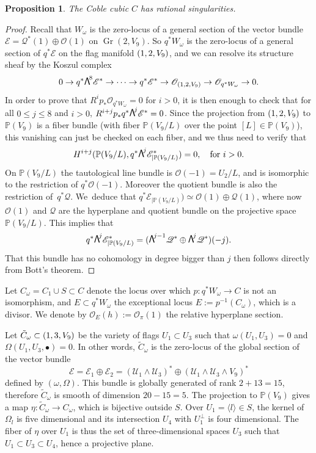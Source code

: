 \documentclass[JEP,XML,SOM,Unicode,NoEqCountersInSection]{cedram}
\newcommand{\NoChangel}[1]{%
\expandafter\let\csname old\string#1\endcsname=#1
\let#1=\relax
\newcommand{#1}{\mathcode`l="716C\csname old\string#1\endcsname\mathcode`l="7160 }%
}
\newcommand{\sbullet}{{\scriptstyle\bullet}}
\newcommand\bw[1]{{\hbox{\large$\mathsf{\Lambda}$}^{\!#1}}}
\let\mathcal\mathscr
\theoremstyle{plain}
\newtheorem{prop}[theorem]{Proposition}
\theoremstyle{definition}
\DeclareMathOperator{\Gr}{Gr}
\DeclareMathOperator{\Fl}{Fl}\NoChangel{\Fl}
\newcommand{\PP}{\mathbb{P}}
\newcommand{\sheaf}[1]{\mathcal{#1}}
\newcommand{\ke}{\sheaf{E}}
\newcommand{\ko}{\sheaf{O}}\let\OO\ko\let\cO\ko
\newcommand{\kq}{\sheaf{Q}}
\newcommand{\ku}{\sheaf{U}}
\begin{document}
\begin{prop}\label{coblerat}
The Coble cubic $C$ has rational singularities.
\end{prop}

\begin{proof}
Recall that $W_\omega$ is the zero-locus of a general section of the vector bundle $\ke=\kq^*(1)\oplus \ko(1)$ on $\Gr(2,V_9)$. So $q^*W_\omega$ is the zero-locus of a general
section of $q^*\ke$ on the flag manifold $\Fl(1,2,V_9)$, and we can resolve its structure
sheaf by the Koszul complex\enlargethispage{-1.5\baselineskip}%
\[
0\to q^*\bw8\ke^*\to\cdots\to q^*\ke^*\to \ko_{\Fl(1,2,V_9)}\to\ko_{q^*W_\omega}\to 0.
\]
In order to prove that $R^ip_{*}\ko_{q^*W_\omega}=0$ for $i>0$, it is then enough to check
that for all $0\le j\le 8$ and $i>0$, $R^{i+j}p_{*}q^*\bw{j}\ke^*=0$. Since the
projection from $\Fl(1,2,V_9)$ to $\PP(V_9)$ is a fiber bundle (with fiber $\PP(V_9/L)$ over the
point $[L]\in \PP(V_9)$), this vanishing can just be checked on each fiber, and we thus
need to verify that
\[
H^{i+j}(\PP(V_9/L), q^*\bw{j}\ke^*_{|\PP(V_9/L)})=0, \quad\text{for } i>0.
\]
On $\PP(V_9/L)$ the tautological line bundle is $\ko(-1)=U_2/L$, and is isomorphic to the restriction of $q^*\ko(-1)$. Moreover the quotient bundle is also the restriction of~$q^*\kq$.
We~deduce that $q^*\ke_{|\PP(V_9/L)})\simeq \ko(1)\oplus \kq(1)$, where now $\ko(1)$ and $\kq$
are the hyperplane and quotient bundle on the projective space $\PP(V_9/L)$. This implies that
\[
q^*\bw{j}\ke^*_{|\PP(V_9/L)}=(\bw{j-1}\kq^*\oplus \bw{j}\kq^*)(-j).
\]
That this bundle has no cohomology in degree bigger than $j$ then follows directly from
Bott's theorem.
\end{proof}

Let $C_\omega=C_1\cup S\subset C$ denote the locus over which $p: q^* W_{\omega} \to C$ is not an
isomorphism, and $E \subset q^* W_\omega$ the exceptional locus $E:=p^{-1}(C_\omega)$, which is
a divisor. We denote by $\ko_E(h):=\ko_\pi(1)$ the relative hyperplane section.

Let $\tilde C_\omega\subset
\Fl(1,3,V_9)$ be the variety of flags $U_1\subset U_3$ such that $\omega(U_1,U_3)=0$ and
$\Omega(U_1,U_3,\sbullet)=0$. In other words, $\tilde C_\omega$ is the zero-locus of the
global section of the vector bundle \[
\ke=\ke_1\oplus\ke_2=(\ku_1\wedge \ku_3)^*\oplus (\ku_1\wedge \ku_3\wedge V_9)^*
\]
defined by $(\omega, \Omega)$.
This bundle is globally generated of rank $2+13=15$, therefore $\tilde C_\omega$ is smooth
of dimension $20-15=5$. The projection to $\PP (V_9)$ gives a map $\eta : \tilde C_\omega\to C_\omega$,
which is bijective outside $S$.
Over $U_1=\langle l\rangle\in S$, the kernel of $\Omega_l$ is five
dimensional and its intersection $U_4$ with $U_1^\perp$ is four dimensional.
The fiber of $\eta$ over $U_1$ is thus the set of three-dimensional spaces $U_3$
such that $U_1\subset U_3\subset U_4$,
hence a projective plane.
\end{document}
